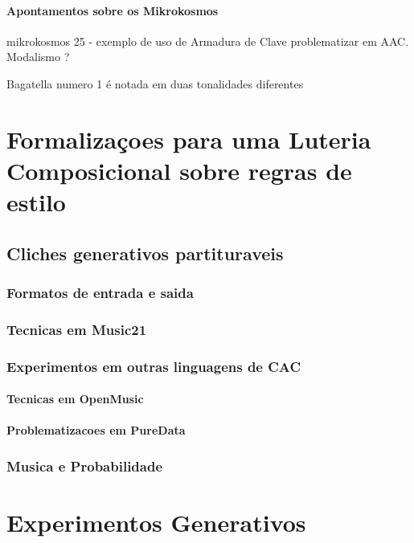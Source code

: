 \documentclass[
	12pt,				%
	openright,			%
	twoside,			%
	a4paper,			%
	english,			%
	french,				%
	spanish,			%
	brazil				%
	]{abntex2}
\begin{document}
\subsection{Apontamentos sobre os Mikrokosmos}

mikrokosmos 25 - exemplo de uso de Armadura de Clave problematizar em AAC. Modalismo ?

Bagatella numero 1 é notada em duas tonalidades diferentes


\cite{suchoff2004bartok}






\part{Formalizaçoes para uma Luteria Composicional sobre regras de estilo}

\chapter{Cliches generativos partituraveis}

\section{Formatos de entrada e saida}

\section{Tecnicas em Music21}

\section{Experimentos em outras linguagens de CAC}

\subsection{Tecnicas em OpenMusic}

\subsection{Problematizacoes em PureData}

\section{Musica e Probabilidade}

\part{Experimentos Generativos}
\end{document}
